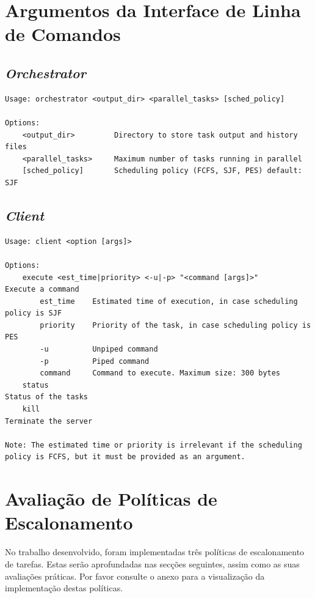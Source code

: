 \documentclass[a4paper,11pt]{scrreprt}
\begin{document}
\begin{minipage}{\textwidth}
\chapter{Argumentos da Interface de Linha de Comandos}
    \section{\textit{Orchestrator}}
\begin{lstlisting}
Usage: orchestrator <output_dir> <parallel_tasks> [sched_policy]

Options:
    <output_dir>         Directory to store task output and history files
    <parallel_tasks>     Maximum number of tasks running in parallel
    [sched_policy]       Scheduling policy (FCFS, SJF, PES) default: SJF
\end{lstlisting}
    \section{\textit{Client}}
\begin{lstlisting}
Usage: client <option [args]>

Options:
    execute <est_time|priority> <-u|-p> "<command [args]>"            Execute a command
        est_time    Estimated time of execution, in case scheduling policy is SJF
        priority    Priority of the task, in case scheduling policy is PES
        -u          Unpiped command
        -p          Piped command
        command     Command to execute. Maximum size: 300 bytes
    status                                                            Status of the tasks
    kill                                                              Terminate the server

Note: The estimated time or priority is irrelevant if the scheduling policy is FCFS, but it must be provided as an argument.
\end{lstlisting}
\end{minipage}

\chapter{Avaliação de Políticas de Escalonamento}
    No trabalho desenvolvido, foram implementadas três políticas de escalonamento de tarefas.
    Estas serão aprofundadas nas secções seguintes, assim como as suas avaliações práticas.
    Por favor consulte o anexo  para a visualização da implementação destas políticas.
\end{document}
